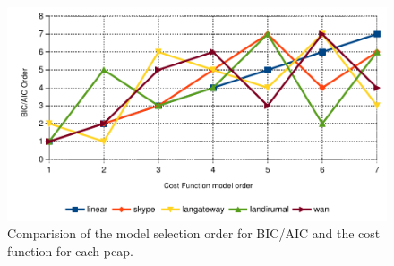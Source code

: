 \begin{figure}[ht!]
{\centering
\includegraphics[width=\columnwidth]{figures/pcap-comparision}
\caption{Comparision of the model selection order for BIC/AIC and the cost function for each pcap.}
\label{fig:model-order}\par}
\end{figure}




